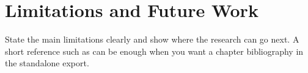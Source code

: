 \section{Limitations and Future Work}

State the main limitations clearly and show where the research can go next. A short reference such as \textcite{doe2026} can be enough when you want a chapter bibliography in the standalone export.
